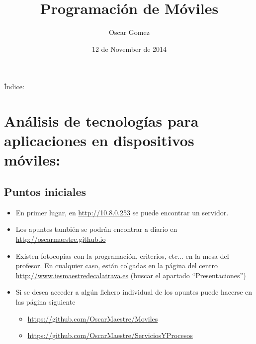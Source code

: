 \documentclass[a4paper,12pt,spanish]{sphinxmanual}
\title{Programación de Móviles}
\date{12 de November de 2014}
\author{Oscar Gomez}
\begin{document}
\maketitle
\tableofcontents
{}\label{index::doc}


Índice:


\chapter{Análisis de tecnologías para aplicaciones en dispositivos móviles:}
\label{tema1::doc}\label{tema1:prog-multimedia-y-de-dispositivos-moviles}\label{tema1:analisis-de-tecnologias-para-aplicaciones-en-dispositivos-moviles}

\section{Puntos iniciales}
\label{tema1:puntos-iniciales}\begin{itemize}
\item {} 
En primer lugar, en \href{http://10.8.0.253}{http://10.8.0.253} se puede encontrar un servidor.

\item {} 
Los apuntes también se podrán encontrar a diario en \href{http://oscarmaestre.github.io}{http://oscarmaestre.github.io}

\item {} 
Existen fotocopias con la programación, criterios, etc... en la mesa del profesor. En cualquier caso, están colgadas en la página del centro \href{http://www.iesmaestredecalatrava.es}{http://www.iesmaestredecalatrava.es} (buscar el apartado ``Presentaciones'')

\item {} 
Si se desea acceder a algún fichero individual de los apuntes puede hacerse en las página siguiente
\begin{itemize}
\item {} 
\href{https://github.com/OscarMaestre/Moviles}{https://github.com/OscarMaestre/Moviles}

\item {} 
\href{https://github.com/OscarMaestre/ServiciosYProcesos}{https://github.com/OscarMaestre/ServiciosYProcesos}

\end{itemize}

\end{itemize}
\end{document}
